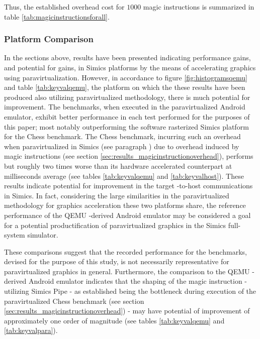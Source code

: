Thus, the established overhead cost for $1000$ magic instructions is summarized in table \ref{tab:magicinstructionsforall}.

\subsubsection{Platform Comparison}
\label{sec:analysisexperiment_platformcomparison}
In the sections above, results have been presented indicating performance gains, and potential for gains, in Simics platforms by the means of accelerating graphics using paravirtualization.
However, in accordance to figure \ref{fig:histogramsqemu} and table \ref{tab:keyvalqemu}, the platform on which the these results have been produced also utilizing paravirtualized methodology, there is much potential for improvement.
The benchmarks, when executed in the paravirtualized Android emulator, exhibit better performance in each test performed for the purposes of this paper; most notably outperforming the software rasterized Simics platform for the Chess benchmark.
The Chess benchmark, incurring such an overhead when paravirtualized in Simics (see paragraph ) due to overhead induced by magic instructions (see section \ref{sec:results_magicinstructionoverhead}), performs but roughly two times worse than its hardware accelerated counterpart at  milliseconds average (see tables \ref{tab:keyvalqemu} and \ref{tab:keyvalhost}).
These results indicate potential for improvement in the target -to-host communications in Simics.
In fact, considering the large similarities in the paravirtualized methodology for graphics acceleration these two platforms share, the reference performance of the QEMU -derived Android emulator may be considered a goal for a potential productification of paravirtualized graphics in the Simics full-system simulator.

These comparisons suggest that the recorded performance for the benchmarks, devised for the purpose of this study, is not necessarily representative for paravirtualized graphics in general.
Furthermore, the comparison to the QEMU -derived Android emulator indicates that the shaping of the magic instruction -utilizing Simics Pipe - as established being the bottleneck during execution of the paravirtualized Chess benchmark (see section \ref{sec:results_magicinstructionoverhead}) - may have potential of improvement of approximately one order of magnitude (see tables \ref{tab:keyvalqemu} and \ref{tab:keyvalpara}).

